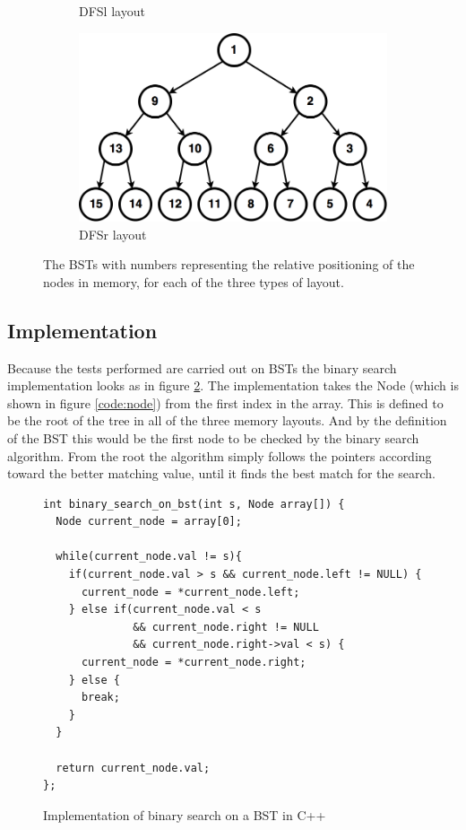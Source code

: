 \documentclass{article}
\begin{document}
\begin{figure}[H]
\begin{subfigure}[b]{0.49\textwidth}
    \caption{DFSl layout}
  \end{subfigure}
    \begin{subfigure}[b]{0.49\textwidth}
    \includegraphics[width=\textwidth]{figures/DFSr_layout}	
    \caption{DFSr layout}
  \end{subfigure}
  \caption{The BSTs with numbers representing the relative positioning of the nodes in memory, for each of the three types of layout.}
  \label{fig:BST_layouts}
\end{figure}

\subsection{Implementation}
Because the tests performed are carried out on BSTs the binary search implementation looks as in figure \ref{code:binary_search_bst}. The implementation takes the Node (which is shown in figure \ref{code:node}) from the first index in the array. This is defined to be the root of the tree in all of the three memory layouts. And by the definition of the BST this would be the first node to be checked by the binary search algorithm. From the root the algorithm simply follows the pointers according toward the better matching value, until it finds the best match for the search.

\begin{figure}[H]
  \centering
  \begin{lstlisting}
int binary_search_on_bst(int s, Node array[]) {
  Node current_node = array[0];

  while(current_node.val != s){
    if(current_node.val > s && current_node.left != NULL) {
      current_node = *current_node.left;
    } else if(current_node.val < s 
    		  && current_node.right != NULL 
  		      && current_node.right->val < s) {
      current_node = *current_node.right;
    } else {
      break;
    }
  }

  return current_node.val;
};
  \end{lstlisting}
  \caption{Implementation of binary search on a BST in C++}
  \label{code:binary_search_bst}
\end{figure}
\end{document}
